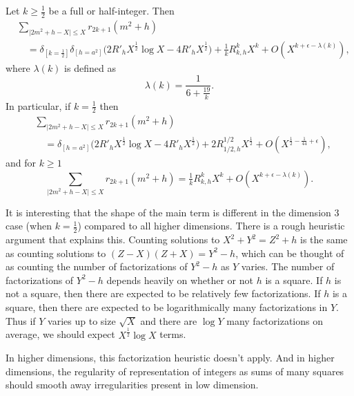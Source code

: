 \begin{theorem}\label{thm:hyp:sharp_theorem_full}
  Let $k \geq \frac{1}{2}$ be a full or half-integer.
  Then
  \begin{align}
    &\sum_{\lvert 2m^2 + h - X \rvert \leq X} r_{2k+1}(m^2 + h) \\
    &\quad= \delta_{[k = \frac{1}{2}]} \delta_{[h = a^2]} \bigg( 2 R'_h X^{\frac{1}{2}}
  \log X -4 R'_h X^{\frac{1}{2}} \bigg) + \tfrac{1}{k} R_{k, h}^k X^{k} + O(X^{k +
\epsilon - \lambda(k)}),
  \end{align}
  where $\lambda(k)$ is defined as
  \begin{equation}
    \lambda(k) = \frac{1}{6 + \frac{19}{k}}.
  \end{equation}
  In particular, if $k = \frac{1}{2}$ then
  \begin{align}
    &\sum_{\lvert 2m^2 + h - X \rvert \leq X} r_{2k+1}(m^2 + h) \\
    &\quad = \delta_{[h = a^2]} \bigg( 2 R'_h X^{\frac{1}{2}} \log X -4 R'_h
  X^{\frac{1}{2}} \bigg) + 2R_{1/2, h}^{1/2} X^{\frac{1}{2}} + O(X^{\frac{1}{2} -
\frac{1}{44} + \epsilon}),
  \end{align}
  and for $k \geq 1$
  \begin{equation}
    \sum_{\lvert 2m^2 + h - X \rvert \leq X} r_{2k+1}(m^2 + h)  = \tfrac{1}{k} R_{k, h}^k
    X^{k} + O(X^{k + \epsilon - \lambda(k)}).
  \end{equation}
\end{theorem}


\begin{remark}
  It is interesting that the shape of the main term is different in the dimension $3$ case
  (when $k = \frac{1}{2}$) compared to all higher dimensions.
  There is a rough heuristic argument that explains this.
  Counting solutions to $X^2 + Y^2 = Z^2 + h$ is the same as counting solutions to
  $(Z-X)(Z+X) = Y^2 - h$, which can be thought of as counting the number of factorizations
  of $Y^2 - h$ as $Y$ varies.
  The number of factorizations of $Y^2 - h$ depends heavily on whether or not $h$ is a
  square.
  If $h$ is not a square, then there are expected to be relatively few factorizations.
  If $h$ is a square, then there are expected to be logarithmically many factorizations in
  $Y$.
  Thus if $Y$ varies up to size $\sqrt X$ and there are $\log Y$ many factorizations on
  average, we should expect $X^{\frac{1}{2}} \log X$ terms.


  In higher dimensions, this factorization heuristic doesn't apply.
  And in higher dimensions, the regularity of representation of integers as sums of many
  squares should smooth away irregularities present in low dimension.
\end{remark}





